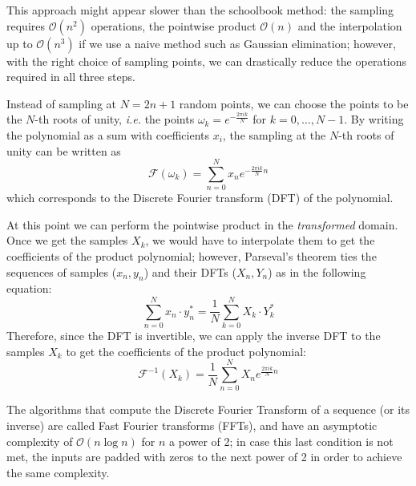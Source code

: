 This approach might appear slower than the schoolbook method: the sampling requires $\mathcal{O}(n^2)$ operations, the pointwise product
$\mathcal{O}(n)$ and the interpolation up to $\mathcal{O}(n^3)$ if we use a naive method such as Gaussian elimination; however, 
with the right choice of sampling points, we can drastically reduce the operations required in all three steps.

Instead of sampling at $N = 2n+1$ random points, we can choose the points to be the $N$-th roots of unity, \textit{i.e.} the points
$\omega_k = e^{-\frac{2\pi ik}{N}}$ for $k=0,\dots,N-1$. By writing the polynomial as a sum with coefficients $x_i$, the sampling at the $N$-th roots of unity
can be written as
\begin{equation}
    \mathcal{F}(\omega_k) = \sum_{n=0}^{N} x_n e^{-\frac{2\pi ik}{N}n}
    \label{DFT}
\end{equation}
which corresponds to the Discrete Fourier transform (DFT) of the polynomial.

At this point we can perform the pointwise product in the \textit{transformed} domain.
Once we get the samples $X_k$, we would have to interpolate them to get the coefficients of the product polynomial; however,
Parseval's theorem ties the sequences of samples ($x_n, y_n$) and their DFTs ($X_n, Y_n$) as in the following equation:
\begin{equation}
    \sum_{n=0}^{N} x_n\cdot y_n^* = \frac{1}{N}\sum_{k=0}^{N} X_k\cdot Y_k^*
\end{equation}
\newpage
Therefore, since the DFT is invertible, we can apply the inverse DFT to the samples $X_k$ to get the coefficients of the product polynomial:
\begin{equation}
    \mathcal{F}^{-1}(X_k) = \frac{1}{N}\sum_{n=0}^{N} X_n e^{\frac{2\pi i k}{N}n}
\end{equation}

The algorithms that compute the Discrete Fourier Transform of a sequence (or its inverse) are called Fast Fourier transforms (FFTs), and have an asymptotic complexity
of $\mathcal{O}(n\log n)$ for $n$ a power of 2; in case this last condition is not met, the inputs are padded with zeros to the next power of 2 in order to
achieve the same complexity.

